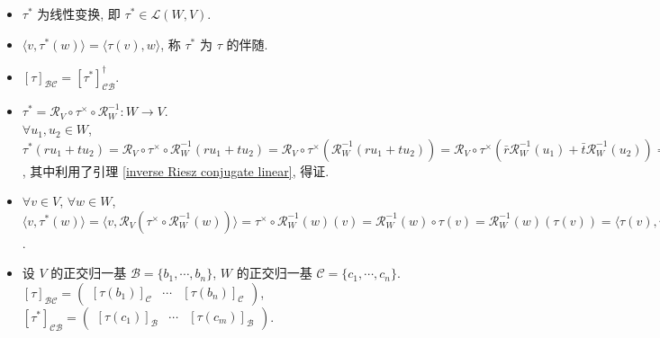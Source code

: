 \documentclass{note}
\begin{document}
\begin{thm}[(课本定理 10.1)]\label{thm-10.1}
    \begin{itemize}
        \item[(1)] $\tau^*$ 为线性变换, 即 $\tau^*\in\mathcal{L}(W,V)$.
        \item[(2)] $\langle v,\tau^*(w)\rangle=\langle\tau(v),w\rangle$, 称 $\tau^*$ 为 $\tau$ 的伴随.
        \item[(3)] $[\tau]_{\mathcal{BC}}=[\tau^*]_{\mathcal{CB}}^{\dagger}$.
    \end{itemize}
\end{thm}
\begin{pf}
    \begin{itemize}
        \item[(1)] $\tau^*=\mathcal{R}_V\circ\tau^{\times}\circ\mathcal{R}_W^{-1}:W\rightarrow V$.\\
        $\forall u_1,u_2\in W$, $\tau^*(ru_1+tu_2)=\mathcal{R}_V\circ\tau^{\times}\circ\mathcal{R}_W^{-1}(ru_1+tu_2)=\mathcal{R}_V\circ\tau^{\times}(\mathcal{R}_W^{-1}(ru_1+tu_2))=\mathcal{R}_V\circ\tau^{\times}(\bar{r}\mathcal{R}_W^{-1}(u_1)+\bar{t}\mathcal{R}_W^{-1}(u_2))=\mathcal{R}_V(\tau^{\times}(\bar{r}\mathcal{R}_W^{-1}(u_1)+\bar{t}\mathcal{R}_W^{-1}(u_2)))=\mathcal{R}_V(\bar{r}\tau^{\times}(\mathcal{R}_W^{-1}(u_1))+\bar{t}\tau^{\times}(\mathcal{R}_W^{-1}(u_2)))=r\mathcal{R}_V(\tau^{\times}(\mathcal{R}_W^{-1}(u_1)))+t\mathcal{R}_V(\tau^{\times}(\mathcal{R}_W^{-1}(u_2)))=r\tau^*(u_1)+t\tau^*(u_2)$, 其中利用了引理 \ref{inverse Riesz conjugate linear}, 得证.
        \item[(2)] $\forall v\in V$, $\forall w\in W$, $\langle v,\tau^*(w)\rangle=\langle v,\mathcal{R}_V(\tau^{\times}\circ\mathcal{R}_W^{-1}(w))\rangle=\tau^{\times}\circ\mathcal{R}_W^{-1}(w)(v)=\mathcal{R}_W^{-1}(w)\circ\tau(v)=\mathcal{R}_W^{-1}(w)(\tau(v))=\langle\tau(v),w\rangle$.
        \item[(3)] 设 $V$ 的正交归一基 $\mathcal{B}=\{b_1,\cdots,b_n\}$, $W$ 的正交归一基 $\mathcal{C}=\{c_1,\cdots,c_n\}$.\\
        $[\tau]_{\mathcal{BC}}=\begin{pmatrix}
            [\tau(b_1)]_{\mathcal{C}}&\cdots&[\tau(b_n)]_{\mathcal{C}}
        \end{pmatrix}$, $[\tau^*]_{\mathcal{CB}}=\begin{pmatrix}
            [\tau(c_1)]_{\mathcal{B}}&\cdots&[\tau(c_m)]_{\mathcal{B}}
        \end{pmatrix}$.\\

\end{itemize}
\end{pf}
\end{document}
